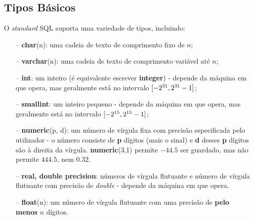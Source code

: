 \documentclass[oneside]{book}
\theoremstyle{definition}
\begin{document}
\subsection{Tipos Básicos}
O \textit{standard} SQL suporta uma variedade de tipos, incluindo:
\begin{itemize}
    \itemsep0cm
    \item[--]\textbf{char}(n): uma cadeia de texto de comprimento fixo de $n$;
    \item[--]\textbf{varchar}(n): uma cadeia de texto de comprimento variável até $n$;
    \item[--]\textbf{int}: um inteiro (é equivalente escrever \textbf{integer}) - depende da máquina em que opera, mas geralmente está no intervalo $\interval{-2^{31}}{2^{31} - 1}$;
    \item[--]\textbf{smallint}: um inteiro pequeno - depende da máquina em que opera, mas geralmente está no intervalo $\interval{-2^{15}}{2^{15} - 1}$;
    \item[--]\textbf{numeric}(p, d): um número de vírgula fixa com precisão especificada pelo utilizador - o número consiste de \textbf{p} dígitos (mais o sinal) e \textbf{d} desses \textbf{p} dígitos são à direita da vírgula. \textbf{numeric}(3,1) permite $-44.5$ ser guardado, mas não permite $444.5$, nem $0.32$.
    \item[--]\textbf{real, double precision}: números de vírgula flutuante e número de vírgula flutuante com precisão de \textit{double} - depende da máquina em que opera.
    \item[--]\textbf{float}(n): um número de vírgula flutuante com uma precisão de \textbf{pelo menos} $n$ dígitos.
\end{itemize}
\end{document}

